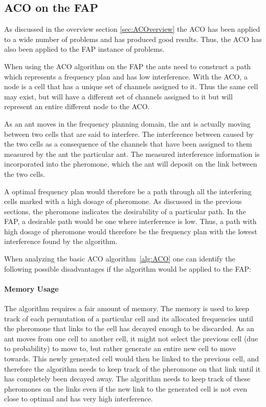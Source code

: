 \subsection{ACO on the FAP}
As discussed in the overview section \ref{sec:ACOverview} the ACO has been applied to a wide number of problems and has produced good results. Thus, the ACO has also been applied to the FAP instance of problems.

When using the ACO algorithm on the FAP the ants need to construct a path which represents a frequency plan and has low interference. With the ACO, a node is a cell that has a unique set of channels assigned to it. Thus the same cell may exist, but will have a different set of channels assigned to it but will represent an entire different node to the ACO.

As an ant moves in the frequency planning domain, the ant is actually moving between two cells that are said to interfere. The interference between caused by the two cells as a consequence of the channels that have been assigned to them measured by the ant the particular ant. The measured interference information is incorporated into the pheromone, which the ant will deposit on the link between the two cells.

A optimal frequency plan would therefore be a path through all the interfering cells marked with a high dosage of pheromone. As discussed in the previous sections, the pheromone indicates the desirability of a particular path. In the FAP, a desirable path would be one where interference is low. Thus, a path with high dosage of pheromone would therefore be the frequency plan with the lowest interference found by the algorithm.

When analyzing the basic ACO algorithm~\ref{alg:ACO} one can identify the following possible disadvantages if the algorithm would be applied to the FAP:
\paragraph{Memory Usage}
The algorithm requires a fair amount of memory. The memory is used to keep track of each permutation of a particular cell and its allocated frequencies until the pheromone that links to the cell has decayed enough to be discarded. As an ant moves from one cell to another cell, it might not select the previous cell (due to probability) to move to, but rather generate an entire new cell to move towards. This newly generated cell would then be linked to the previous cell, and therefore the algorithm needs to keep track of the pheromone on that link until it has completely been decayed away. The algorithm needs to keep track of these pheromones on the links even if the new link to the generated cell is not even close to optimal and has very high interference.
